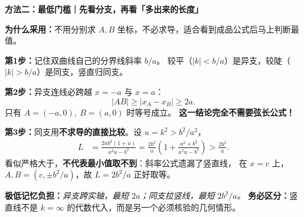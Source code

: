 \clearpage
\begin{proofbox}
\textbf{方法二：最低门槛｜先看分支，再看「多出来的长度」}
\begin{center}\end{center}

\textbf{为什么采用：}不用分别求 $A,B$ 坐标，不必求导，适合看到成品公式后马上判断最值。

\textbf{第1步：}记住双曲线自己的分界线斜率 $b/a$。
较平（$|k|<b/a$）是异支，较陡（$|k|>b/a$）是同支，竖直归同支。

\textbf{第2步：}异支连线必跨越 $x=-a$ 与 $x=a$：
\[
\boxed{|AB|\ge|x_A-x_B|\ge2a}.\tag{2}
\]
只有 $A=(-a,0),\ B=(a,0)$ 时等号成立。
\textbf{这一结论完全不需要弦长公式！}

\textbf{第3步：}同支用\textbf{不求导的直接比较}。设 $u=k^2>b^2/a^2$，
\[
\begin{aligned}
L&=\frac{2ab^2(1+u)}{a^2u-b^2}
=\frac{2b^2}{a}\left(1+\frac{a^2+b^2}{a^2u-b^2}\right)
>\frac{2b^2}{a}.
\end{aligned}
\]
看似严格大于，\textbf{不代表最小值取不到}：斜率公式遗漏了竖直线，
在 $x=c$ 上，$A,B=(c,\pm b^2/a)$，故 $L=2b^2/a$ 正好取等。

\textbf{极低记忆负担：}\emph{异支跨实轴，最短 $2a$；同支拉竖线，最短 $2b^2/a$。}
\textbf{务必区分：}竖直线不是 $k=\infty$ 的代数代入，而是另一个必须核验的几何情形。
\end{proofbox}

